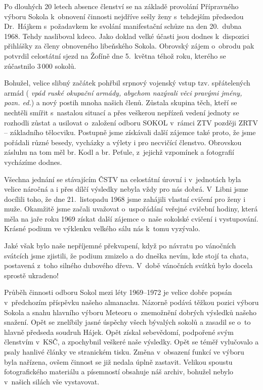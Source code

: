 \documentclass[a5paper, 11pt, twoside]{article}
\newcommand{\pozned}[1]{%
\textit{#1}}
\begin{document}
Po dlouhých 20 letech absence členství se na základě provolání
Přípravného výboru Sokola k~obnovení činnosti nejdříve sešly ženy
s~tehdejším předsedou Dr.~Hájkem s~požadavkem ke svolání manifestační
schůze na den 20.~dubna 1968. Tehdy nasliboval kdeco. Jako doklad velké
účasti jsou dodnes k~dispozici přihlášky za členy obnoveného libeňského
Sokola. Obrovský zájem o~obrodu pak potvrdil celostátní sjezd na Žofíně
dne 5.~května téhož roku, kterého se zúčastnilo 3\,000 sokolů.

Bohužel, velice slibný začátek pohřbil srpnový vojenský vstup tzv.
spřátelených armád (\pozned{vpád ruské okupační armády, abychom nazývali
věci pravými jmény, pozn. ed.}) a nový postih mnoha našich členů.
Zůstala skupina těch, kteří se nechtěli smířit s~nastalou situací a přes
veškerou nepřízeň vedení jednoty se rozhodli zůstat a usilovat
o~založení odboru SOKOL v~rámci ZTV později ZRTV -- základního tělocviku.
Postupně jsme získávali další zájemce také proto, že jsme pořádali různé
besedy, vycházky a výlety i pro necvičící členstvo. Obrovskou zásluhu na
tom měl br. Kodl a br. Peťule, z~jejichž vzpomínek a fotografií
vycházíme dodnes.

Všechna jednání se stávajícím ČSTV na celostátní úrovní i v~jednotách
byla velice náročná a i přes dílčí výsledky nebyla vždy pro nás dobrá.
V~Libni jsme docílili toho, že dne 21.~listopadu 1968 jsme zahájili
vlastní cvičení pro ženy i muže. Okamžitě jsme začali uvažovat
o~uspořádání veřejné cvičební hodiny, která měla na jaře roku 1969 získat
další zájemce o~naše sokolské cvičení i vystupování. Krásné podium ve
výklenku velkého sálu nás k~tomu vyzývalo.

Jaké však bylo naše nepříjemné překvapení, když po návratu po vánočních
svátcích jsme zjistili, že podium zmizelo a do dneška nevím, kde stojí
ta chata, postavená z~toho silného dubového dřeva. V~době vánočních
svátků bylo docela sprostě ukradeno!

Průběh činnosti odboru Sokol mezi léty 1969--1972 je velice
dobře popsán v~předchozím příspěvku našeho almanachu. Názorně podává
těžkou pozici výboru Sokola a snahu hlavního výboru Meteoru o~znemožnění
dobrých výsledků našeho snažení. Opět se znelíbily jasné úspěchy všech
bývalých sokolů a zasadil se o~to hlavně předseda soudruh Hájek. Opět
získal sebevědomí, podpořené svým členstvím v~KSČ, a zpochybnil veškeré
naše výsledky. Opět se téměř vylučovalo a psaly hanlivé články ve
stranickém tisku. Změna v~obsazení funkcí ve výboru byla nařízena, ovšem
činnost se již nedala úplně zastavit. Velikou spoustu fotografického
materiálu a písemností obsahuje náš archiv, bohužel nebylo v~našich
silách vše vystavovat.
\end{document}
